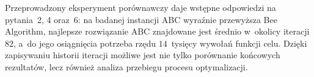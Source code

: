 Przeprowadzony eksperyment porównawczy daje wstępne odpowiedzi na pytania~2,
4 oraz~6: na badanej instancji ABC wyraźnie przewyższa Bee Algorithm, najlepsze
rozwiązanie ABC znajdowane jest średnio w~okolicy iteracji $82$, a~do jego
osiągnięcia potrzeba rzędu $14$~tysięcy wywołań funkcji celu. Dzięki zapisywaniu
historii iteracji możliwe jest nie tylko porównanie końcowych rezultatów, lecz
również analiza przebiegu procesu optymalizacji.
